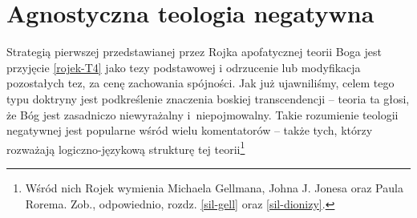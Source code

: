 

\section{Agnostyczna teologia negatywna}\label{roj-agnostycna}

Strategią pierwszej przedstawianej przez Rojka apofatycznej teorii Boga
jest przyjęcie \eqref{rojek-T4} jako tezy podstawowej i odrzucenie lub
modyfikacja pozostałych tez, za cenę zachowania spójności.
Jak już ujawniliśmy, celem tego typu doktryny jest podkreślenie znaczenia
boskiej transcendencji -- teoria ta głosi, że Bóg jest zasadniczo niewyrażalny
i~niepojmowalny. Takie rozumienie teologii negatywnej jest popularne wśród wielu
komentatorów -- także tych, którzy rozważają logiczno-językową strukturę
tej teorii\footnote{Wśród nich Rojek wymienia Michaela Gellmana, Johna J.
Jonesa oraz Paula Rorema. Zob., odpowiednio, rozdz. \ref{sil-gell} oraz \ref{sil-dionizy}.}

